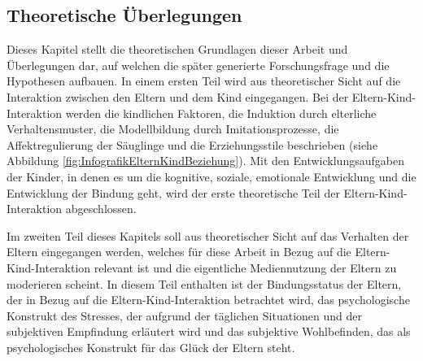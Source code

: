 \subsection{Theoretische Überlegungen}\label{sec:TheretischeÜberlegungen}
Dieses Kapitel stellt die theoretischen Grundlagen dieser Arbeit und Überlegungen dar, auf welchen die später generierte Forschungsfrage und die Hypothesen aufbauen. 
In einem ersten Teil wird aus theoretischer Sicht auf die Interaktion zwischen den Eltern und dem Kind eingegangen. Bei der Eltern-Kind-Interaktion werden die kindlichen Faktoren, die Induktion durch elterliche Verhaltensmuster, die Modellbildung durch Imitationsprozesse, die Affektregulierung der Säuglinge und die Erziehungsstile beschrieben (siehe Abbildung \ref{fig:InfografikElternKindBeziehung}). Mit den Entwicklungsaufgaben der Kinder, in denen es um die kognitive, soziale, emotionale Entwicklung und die Entwicklung der Bindung geht, wird der erste theoretische Teil der Eltern-Kind-Interaktion abgeschlossen.

Im zweiten Teil dieses Kapitels soll aus theoretischer Sicht auf das Verhalten der Eltern eingegangen werden, welches für diese Arbeit in Bezug auf die Eltern-Kind-Interaktion relevant ist und die eigentliche Mediennutzung der Eltern zu moderieren scheint. In diesem Teil enthalten ist der Bindungsstatus der Eltern, der in Bezug auf die Eltern-Kind-Interaktion betrachtet wird, das psychologische Konstrukt des Stresses, der aufgrund der täglichen Situationen und der subjektiven Empfindung erläutert wird und das subjektive Wohlbefinden, das als psychologisches Konstrukt für das Glück der Eltern steht.


